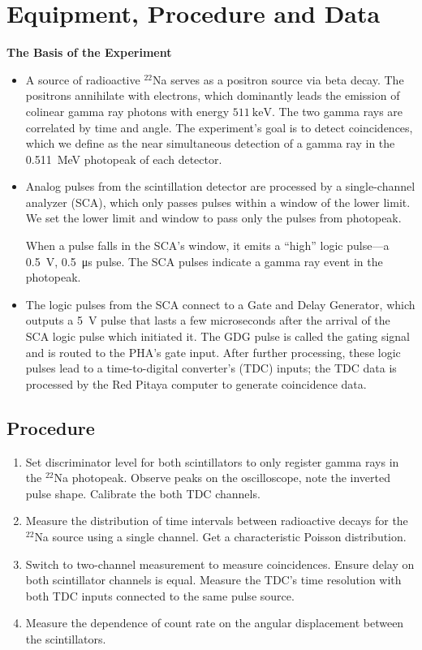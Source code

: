 \documentclass[11pt, a4paper]{article}
\newcommand{\isoptope}[2]{${}^{#2}${#1}}
\begin{document}
\section{Equipment, Procedure and Data}
\textbf{The Basis of the Experiment}
\begin{itemize}
	\item A source of radioactive \isoptope{Na}{22} serves as a positron source via beta decay. The positrons annihilate with electrons, which dominantly leads the emission of colinear gamma ray photons with energy $ \SI{511}{\kilo \electronvolt} $. The two gamma rays are correlated by time and angle. The experiment's goal is to detect coincidences, which we define as the near simultaneous detection of a gamma ray in the \SI{0.511}{\mega \electronvolt} photopeak of each detector.
	
	\item Analog pulses from the scintillation detector are processed by a single-channel analyzer (SCA), which only passes pulses within a window of the lower limit. We set the lower limit and window to pass only the pulses from photopeak.
	
	When a pulse falls in the SCA's window, it emits a ``high'' logic pulse---a \SI{0.5}{\volt}, \SI{0.5}{\micro \second} pulse. The SCA pulses indicate a gamma ray event in the photopeak.
	
	\item The logic pulses from the SCA connect to a Gate and Delay Generator, which outputs a \SI{5}{\volt} pulse that lasts a few microseconds after the arrival of the SCA logic pulse which initiated it. The GDG pulse is called the gating signal and is routed to the PHA's gate input. After further processing, these logic pulses lead to a time-to-digital converter's (TDC) inputs; the TDC data is processed by the Red Pitaya computer to generate coincidence data.
\end{itemize}

\subsection{Procedure}
\begin{enumerate}
	\item Set discriminator level for both scintillators to only register gamma rays in the \isoptope{Na}{22} photopeak. Observe peaks on the oscilloscope, note the inverted pulse shape. Calibrate the both TDC channels.
		
	\item Measure the distribution of time intervals between radioactive decays for the \isoptope{Na}{22} source using a single channel. Get a characteristic Poisson distribution.
	
	\item Switch to two-channel measurement to measure coincidences. Ensure delay on both scintillator channels is equal. Measure the TDC's time resolution with both TDC inputs connected to the same pulse source. 
		
	\item Measure the dependence of count rate on the angular displacement between the scintillators.
	
\end{enumerate}
\end{document}

